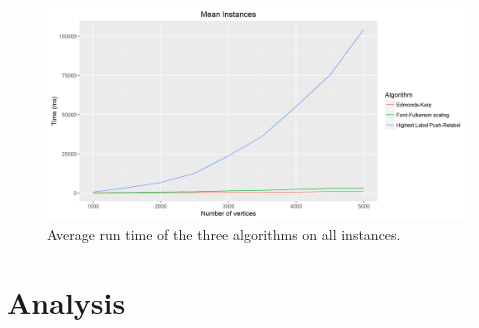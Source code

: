 \begin{figure}[H]
\includegraphics[scale=0.5]{images/MeanInstancessize.png}
\caption{Average run time of the three algorithms on all instances.}
\label{fig:MeanInstancessize}
\end{figure}

\section{Analysis}
